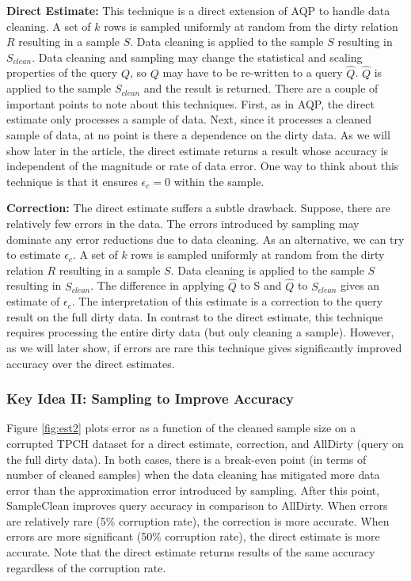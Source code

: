 \vspace{0.5em}
\noindent\textbf{Direct Estimate: } This technique is a direct extension of AQP to handle data cleaning. A set of $k$ rows is sampled uniformly at random from the dirty relation $R$ resulting in a sample $S$. Data cleaning is applied to the sample $S$ resulting in $S_{clean}$.
Data cleaning and sampling may change the statistical and scaling properties of the query $Q$, so $Q$ may have to be re-written to a query $\widehat{Q}$. $\widehat{Q}$ is applied to the sample $S_{clean}$ and the result is returned. 
There are a couple of important points to note about this techniques.
First, as in AQP, the direct estimate only processes a sample of data.
Next, since it processes a cleaned sample of data, at no point is there a dependence on the dirty data.
As we will show later in the article, the direct estimate returns a result whose accuracy is independent of the magnitude or rate of data error. 
One way to think about this technique is that it ensures $\epsilon_c = 0$ within the sample.

\vspace{0.5em}
\noindent\textbf{Correction: } The direct estimate suffers a subtle drawback. Suppose, there are relatively few errors in the data. The errors introduced by sampling may dominate any error reductions due to data cleaning. As an alternative, we can try to estimate $\epsilon_c$. A set of $k$ rows is sampled uniformly at random from the dirty relation $R$ resulting in a sample $S$. Data cleaning is applied to the sample $S$ resulting in $S_{clean}$. 
The difference in applying $\widehat{Q}$ to S and $\widehat{Q}$ to $S_{clean}$ gives an estimate of $\epsilon_c$. 
The interpretation of this estimate is a correction to the query result on the full dirty data.
In contrast to the direct estimate, this technique requires processing the entire dirty data (but only cleaning a sample).
However, as we will later show, if errors are rare this technique gives significantly improved accuracy over the direct estimates.

\subsubsection{Key Idea II: Sampling to Improve Accuracy}
Figure \ref{fig:est2} plots error as a function of the cleaned sample size on a corrupted TPCH dataset for a direct estimate, correction, and AllDirty (query on the full dirty data).
In both cases, there is a break-even point (in terms of number of cleaned samples) when the data cleaning has mitigated more data error than the approximation error introduced by sampling.
After this point, SampleClean improves query accuracy in comparison to AllDirty.
When errors are relatively rare (5\% corruption rate), the correction is more accurate. 
When errors are more significant (50\% corruption rate), the direct estimate is more accurate.
Note that the direct estimate returns results of the same accuracy regardless of the corruption rate. 


